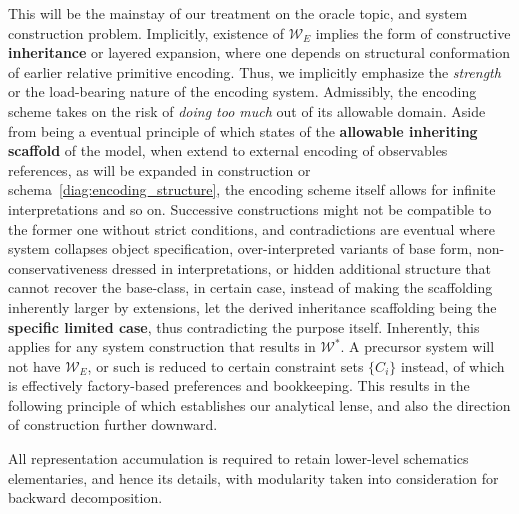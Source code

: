 This will be the mainstay of our treatment on the oracle topic, and system construction problem. Implicitly, existence of $\mathcal{W}_{E}$ implies the form of constructive \textbf{inheritance} or layered expansion, where one depends on structural conformation of earlier relative primitive encoding. Thus, we implicitly emphasize the \textit{strength} or the load-bearing nature of the encoding system. Admissibly, the encoding scheme takes on the risk of \textit{doing too much} out of its allowable domain. Aside from being a eventual principle of which states of the \textbf{allowable inheriting scaffold} of the model, when extend to external encoding of observables references, as will be expanded in construction or schema~\ref{diag:encoding_structure}, the encoding scheme itself allows for infinite interpretations and so on. Successive constructions might not be compatible to the former one without strict conditions, and contradictions are eventual where system collapses object specification, over-interpreted variants of base form, non-conservativeness dressed in interpretations, or hidden additional structure that cannot recover the base-class, in certain case, instead of making the scaffolding inherently larger by extensions, let the derived inheritance scaffolding being the \textbf{specific limited case}, thus contradicting the purpose itself. Inherently, this applies for any system construction that results in $\mathcal{W}^{*}$. A precursor system will not have $\mathcal{W}_{E}$, or such is reduced to certain constraint sets $\{C_{i}\}$ instead, of which is effectively factory-based preferences and bookkeeping. This results in the following principle of which establishes our analytical lense, and also the direction of construction further downward. 

\begin{principle}
	All representation accumulation is required to retain lower-level schematics elementaries, and hence its details, with modularity taken into consideration for backward decomposition.
\end{principle}

